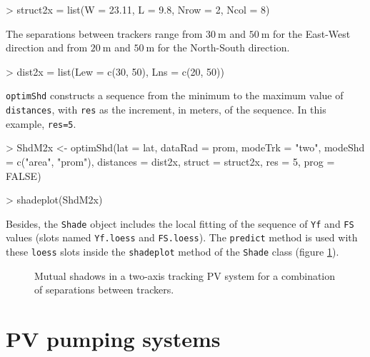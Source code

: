 \documentclass[a4paper]{article}
\renewenvironment{Schunk}{\vspace{\topsep}}{\vspace{\topsep}}
\newcommand{\code}[1]{{\texttt{#1}}}
\begin{document}
\begin{Schunk}
\begin{Sinput}
> struct2x = list(W = 23.11, L = 9.8, Nrow = 2, Ncol = 8)
\end{Sinput}
\end{Schunk}

The separations between trackers range from $\SI{30}{\meter}$ and
$\SI{50}{\meter}$ for the East-West direction and from $\SI{20}{\meter}$
and $\SI{50}{\meter}$ for the North-South direction.

\begin{Schunk}
\begin{Sinput}
> dist2x = list(Lew = c(30, 50), Lns = c(20, 50))
\end{Sinput}
\end{Schunk}

\code{optimShd} constructs a sequence from the minimum to the
maximum value of \code{distances}, with \code{res} as the
increment, in meters, of the sequence. In this example,
\code{res=5}.

\begin{Schunk}
\begin{Sinput}
> ShdM2x <- optimShd(lat = lat, dataRad = prom, modeTrk = "two", 
     modeShd = c("area", "prom"), distances = dist2x, struct = struct2x, 
     res = 5, prog = FALSE)

> shadeplot(ShdM2x)
\end{Sinput}
\end{Schunk}

Besides, the \code{Shade} object includes the local fitting of the
sequence of \code{Yf} and \code{FS} values (slots named
\code{Yf.loess} and \code{FS.loess}). The \code{predict} method is
used with these \code{loess} slots inside the \code{shadeplot} method
of the \code{Shade} class (figure \ref{fig:optim2x}).


\begin{figure}
\centering

\caption{Mutual shadows in a two-axis tracking PV system for a
  combination of separations between trackers.\label{fig:optim2x}}

\end{figure}



\section{PV pumping systems}
\label{sec:pumping}
\end{document}
